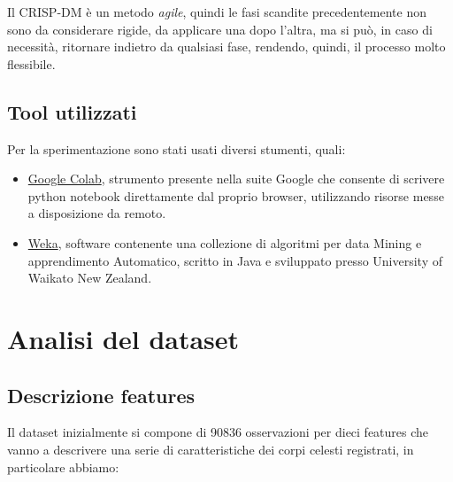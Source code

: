 \documentclass[italian,12pt,a4paper]{article}
\begin{document}
	Il CRISP-DM è un metodo \textit{agile}, quindi le fasi scandite precedentemente non sono da considerare rigide, da applicare una dopo l'altra, ma si può, in caso di necessità, ritornare indietro da qualsiasi fase, rendendo, quindi, il processo molto flessibile.
	
	\subsection{Tool utilizzati}
	Per la sperimentazione sono stati usati diversi stumenti, quali:
	
		\begin{itemize}
			\item \href{https://colab.research.google.com/}{Google Colab}, strumento  presente nella suite Google che consente di scrivere python notebook direttamente dal proprio browser, utilizzando risorse messe a disposizione da remoto. 
			\item \href{https://www.cs.waikato.ac.nz/~ml/weka/}{Weka}, software contenente una collezione di algoritmi per data Mining e apprendimento Automatico, scritto in Java e sviluppato presso University of Waikato New Zealand.
		\end{itemize}


	\section{Analisi del dataset}
	
	\subsection{Descrizione features}
	Il dataset inizialmente si compone di 90836 osservazioni per dieci features che vanno a descrivere una serie di caratteristiche dei corpi celesti registrati, in particolare abbiamo:
	
\end{document}
